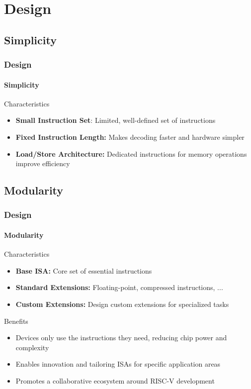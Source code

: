 \documentclass{beamer}
\begin{document}
	\section{Design}
	\subsection{Simplicity}
	\begin{frame}
		\frametitle{Design}
		\framesubtitle{Simplicity}
		
		\begin{alertblock}{Characteristics}
			\begin{itemize}
				\item \textbf{Small Instruction Set}: Limited, well-defined set of instructions
				
				\item \textbf{Fixed Instruction Length:} Makes decoding faster and hardware simpler
				
				\item \textbf{Load/Store Architecture:}  Dedicated instructions for memory operations improve efficiency
			\end{itemize}
		\end{alertblock}
	\end{frame}
	
	\subsection{Modularity}
	\begin{frame}
		\frametitle{Design}
		\framesubtitle{Modularity}
		
		\begin{alertblock}{Characteristics}
			\begin{itemize}
				\item \textbf{Base ISA:} Core set of essential instructions
				
				\item \textbf{Standard Extensions:} Floating-point, compressed instructions, ...
				
				\item \textbf{Custom Extensions:} Design custom extensions for specialized tasks
			\end{itemize}
		\end{alertblock}
		
		\begin{alertblock}{Benefits}
		\begin{itemize}
			\item  Devices only use the instructions they need, reducing chip power and complexity
			
			\item  Enables innovation and tailoring ISAs for specific application areas
			
			\item  Promotes a collaborative ecosystem around RISC-V development
		\end{itemize}
		\end{alertblock}
	\end{frame}
	
\end{document}

